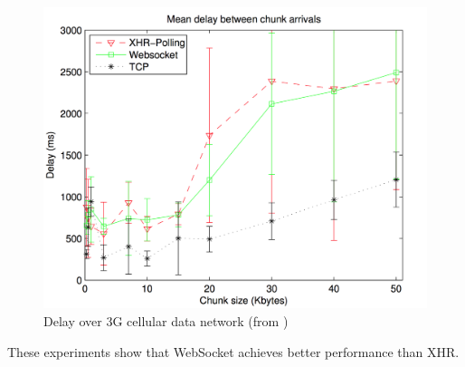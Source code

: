 \documentclass[10pt,journal,compsoc]{IEEEtran}
\newcommand{\ws}{WebSocket}
\begin{document}
\begin{figure}[!ht]
    \centering
    \includegraphics[width=\linewidth]{road.png}
    \caption{Delay over 3G cellular data network (from \cite{roadblock})}
    \label{fig:road}
\end{figure}

These experiments show that \ws{} achieves better performance than XHR.
\end{document}
